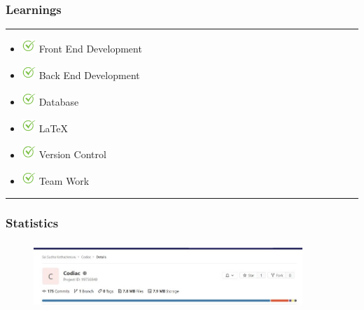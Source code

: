 \documentclass[14pt]{beamer}
\begin{document}
\begin{frame}
    \frametitle{Learnings}
    \noindent
    {\color{pink} \rule{\linewidth}{0.7mm} }
    \begin{itemize}
    \item [] \includegraphics[width=0.2in, height=0.2in]{./Codiac/logos/check.png} Front End Development \\
        \pause
    \item [] \includegraphics[width=0.2in, height=0.2in]{./Codiac/logos/check.png} Back End Development \\
        \pause
    \item [] \includegraphics[width=0.2in, height=0.2in]{./Codiac/logos/check.png} Database\\
        \pause
   \item [] \includegraphics[width=0.2in, height=0.2in]{./Codiac/logos/check.png} LaTeX \\
       \pause
   \item [] \includegraphics[width=0.2in, height=0.2in]{./Codiac/logos/check.png} Version Control \\
       \pause
   \item [] \includegraphics[width=0.2in, height=0.2in]{./Codiac/logos/check.png} Team Work\\
\end{itemize}
\noindent
    {\color{pink} \rule{\linewidth}{0.7mm} }
\end{frame}


\begin{frame}
      \frametitle{Statistics}
        \begin{figure}[htbp]
        \centerline{\includegraphics[width=4in, height=1in]{./Codiac/logos/commit.jpeg}}
  \end{figure}
\end{frame}
\end{document}

